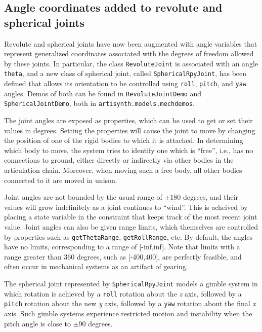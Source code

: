 \documentclass{article}
\begin{document}
\subsection*{Angle coordinates added to revolute and spherical joints}

Revolute and spherical joints have now been augmented with angle
variables that represent generalized coordinates associated with the
degrees of freedom allowed by these joints. In particular, the class
{\tt RevoluteJoint} is associated with an angle {\tt theta}, and a new class
of spherical joint, called {\tt SphericalRpyJoint}, has been defined that
allows its orientation to be controlled using {\tt roll}, {\tt pitch}, and
{\tt yaw} angles. Demos of both can be found in {\tt RevoluteJointDemo} and
{\tt SphericalJointDemo}, both in {\tt artisynth.models.mechdemos}.

The joint angles are exposed as properties, which can be used to get
or set their values in degrees. Setting the properties will cause the
joint to move by changing the position of one of the rigid bodies to
which it is attached. In determining which body to move, the
system tries to identify one which is ``free'', i.e., has no
connections to ground, either directly or indirectly via other bodies in the
articulation chain. Moreover, when moving such a free body, all other
bodies connected to it are moved in unison.

Joint angles are not bounded by the usual range of $\pm 180$ degrees,
and their values will grow indefinitely as a joint continues to
``wind''. This is acheived by placing a state variable in the
constraint that keeps track of the most recent joint value.  Joint
angles can also be given range limits, which themselves are controlled
by properties such as {\tt getThetaRange}, {\tt getRollRange}, etc.  By
default, the angles have no limits, corresponding to a range of
[-inf,inf]. Note that limits with a range greater than 360 degrees,
such as [-400,400], are perfectly feasible, and often occur in
mechanical systems as an artifact of gearing.

\begin{sideblock}
The spherical joint represented by {\tt SphericalRpyJoint} models
a gimble system in which rotation is achieved by a {\tt roll} rotation
about the {\it z} axis, followed by a {\tt pitch} rotation about the new {\it y} axis,
followed by a {\tt yaw} rotation about the final {\it x} axis. Such
gimble systems experience restricted motion and instability 
when the pitch angle is close to $\pm 90$ degrees.
\end{sideblock}
\end{document}
